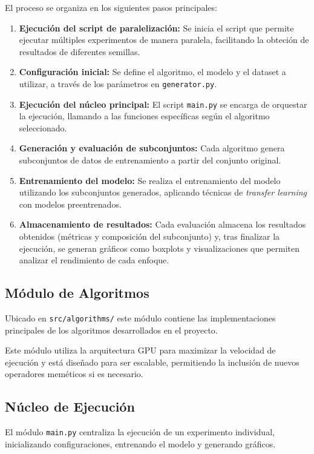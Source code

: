 El proceso se organiza en los siguientes pasos principales:

\begin{enumerate}
      \item \textbf{Ejecución del script de paralelización:} Se inicia el script que permite ejecutar múltiples experimentos de manera paralela,
            facilitando la obteción de resultados de diferentes semillas.
      \item \textbf{Configuración inicial:} Se define el algoritmo, el modelo y el dataset a utilizar, a través de los parámetros en \texttt{generator.py}.
      \item \textbf{Ejecución del núcleo principal:} El script \texttt{main.py} se encarga de orquestar la ejecución,
            llamando a las funciones específicas según el algoritmo seleccionado.
      \item \textbf{Generación y evaluación de subconjuntos:} Cada algoritmo genera subconjuntos de datos de entrenamiento a partir del conjunto original.
      \item \textbf{Entrenamiento del modelo:} Se realiza el entrenamiento del modelo utilizando los subconjuntos generados,
            aplicando técnicas de \textit{transfer learning} con modelos preentrenados.
      \item \textbf{Almacenamiento de resultados:} Cada evaluación almacena los resultados obtenidos (métricas y composición del subconjunto) y,
            tras finalizar la ejecución, se generan gráficos como boxplots y visualizaciones que permiten analizar el rendimiento de cada enfoque.
\end{enumerate}

\subsection{Módulo de Algoritmos}\label{subsec:modulo-de-algoritmos}
Ubicado en \texttt{src/algorithms/} este módulo contiene las implementaciones principales de los
algoritmos desarrollados en el proyecto.

Este módulo utiliza la arquitectura GPU para maximizar la velocidad de ejecución y está diseñado para ser escalable,
permitiendo la inclusión de nuevos operadores meméticos si es necesario.

\subsection{Núcleo de Ejecución}\label{subsec:nucleo-de-ejecucion}
El módulo \texttt{main.py} centraliza la ejecución de un experimento individual, inicializando configuraciones,
entrenando el modelo y generando gráficos.

